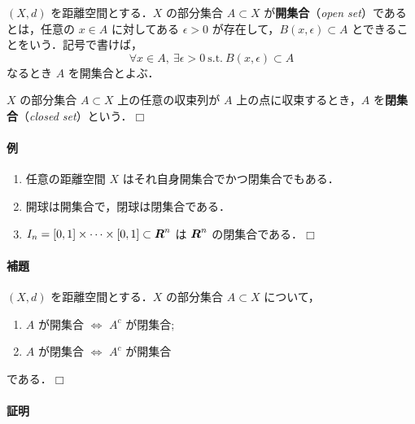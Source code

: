 \documentclass[pandoc,base=10pt,b5j,precisetext]{bxjsarticle}
\providecommand{\tightlist}{%
  \setlength{\itemsep}{0pt}\setlength{\parskip}{0pt}}
\let\oldparagraph\paragraph
\renewcommand{\paragraph}[1]{\oldparagraph{#1}\mbox{}}
\begin{document}
\((X, d)\) を距離空間とする．\(X\) の部分集合 \(A \subset X\)
が\textbf{開集合}（\emph{open set}）であるとは，任意の \(x \in A\)
に対してある \(\epsilon > 0\) が存在して，\(B(x, \epsilon) \subset A\)
とできることをいう．記号で書けば， \[
\forall x \in A,\ \exists \epsilon > 0 \ \text{s.t.}\ B(x, \epsilon) \subset A
\] なるとき \(A\) を開集合とよぶ．

\(X\) の部分集合 \(A \subset X\) 上の任意の収束列が \(A\)
上の点に収束するとき，\(A\) を\textbf{閉集合}（\emph{closed
set}）という．\(\Box\)

\hypertarget{ux4f8b-1}{%
\paragraph{例}\label{ux4f8b-1}}

\begin{enumerate}
\def\labelenumi{\roman{enumi})}
\tightlist
\item
  任意の距離空間 \(X\) はそれ自身開集合でかつ閉集合でもある．
\item
  開球は開集合で，閉球は閉集合である．
\item
  \(I_n = [0, 1] \times \dotsb \times [0, 1] \subset \boldsymbol{R}^n\) は
  \(\boldsymbol{R}^n\) の閉集合である．\(\Box\)
\end{enumerate}

\hypertarget{open-closed-duality}{%
\paragraph{補題}\label{open-closed-duality}}

\((X, d)\) を距離空間とする．\(X\) の部分集合 \(A \subset X\) について，

\begin{enumerate}
\def\labelenumi{\arabic{enumi}.}
\tightlist
\item
  \(A\) が開集合 \(\Longleftrightarrow\) \(A^c\) が閉集合;
\item
  \(A\) が閉集合 \(\Longleftrightarrow\) \(A^c\) が開集合
\end{enumerate}

である．\(\Box\)

\hypertarget{ux8a3cux660e}{%
\paragraph{証明}\label{ux8a3cux660e}}
\end{document}
